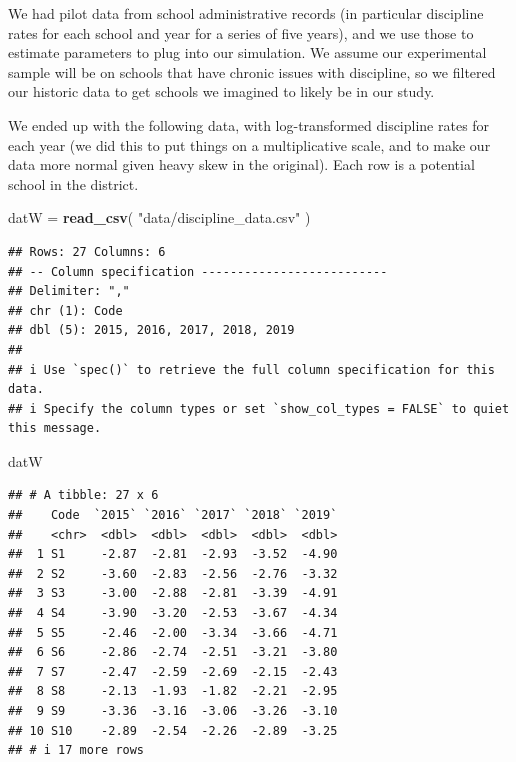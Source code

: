 \documentclass[
]{book}
\newenvironment{Shaded}{\begin{snugshade}}{\end{snugshade}}
\newcommand{\FunctionTok}[1]{\textcolor[rgb]{0.13,0.29,0.53}{\textbf{#1}}}
\newcommand{\NormalTok}[1]{#1}
\newcommand{\OtherTok}[1]{\textcolor[rgb]{0.56,0.35,0.01}{#1}}
\newcommand{\StringTok}[1]{\textcolor[rgb]{0.31,0.60,0.02}{#1}}
\begin{document}
We had pilot data from school administrative records (in particular discipline rates for each school and year for a series of five years), and we use those to estimate parameters to plug into our simulation.
We assume our experimental sample will be on schools that have chronic issues
with discipline, so we filtered our historic data to get schools we imagined to likely be in our study.

We ended up with the following data, with log-transformed discipline rates for each year (we did this to put things on a multiplicative scale, and to make our data more normal given heavy skew in the original). Each row is a potential school in the district.

\begin{Shaded}
\begin{Highlighting}[]
\NormalTok{datW }\OtherTok{=} \FunctionTok{read\_csv}\NormalTok{( }\StringTok{"data/discipline\_data.csv"}\NormalTok{ )}
\end{Highlighting}
\end{Shaded}

\begin{verbatim}
## Rows: 27 Columns: 6
## -- Column specification --------------------------
## Delimiter: ","
## chr (1): Code
## dbl (5): 2015, 2016, 2017, 2018, 2019
## 
## i Use `spec()` to retrieve the full column specification for this data.
## i Specify the column types or set `show_col_types = FALSE` to quiet this message.
\end{verbatim}

\begin{Shaded}
\begin{Highlighting}[]
\NormalTok{datW}
\end{Highlighting}
\end{Shaded}

\begin{verbatim}
## # A tibble: 27 x 6
##    Code  `2015` `2016` `2017` `2018` `2019`
##    <chr>  <dbl>  <dbl>  <dbl>  <dbl>  <dbl>
##  1 S1     -2.87  -2.81  -2.93  -3.52  -4.90
##  2 S2     -3.60  -2.83  -2.56  -2.76  -3.32
##  3 S3     -3.00  -2.88  -2.81  -3.39  -4.91
##  4 S4     -3.90  -3.20  -2.53  -3.67  -4.34
##  5 S5     -2.46  -2.00  -3.34  -3.66  -4.71
##  6 S6     -2.86  -2.74  -2.51  -3.21  -3.80
##  7 S7     -2.47  -2.59  -2.69  -2.15  -2.43
##  8 S8     -2.13  -1.93  -1.82  -2.21  -2.95
##  9 S9     -3.36  -3.16  -3.06  -3.26  -3.10
## 10 S10    -2.89  -2.54  -2.26  -2.89  -3.25
## # i 17 more rows
\end{verbatim}
\end{document}
